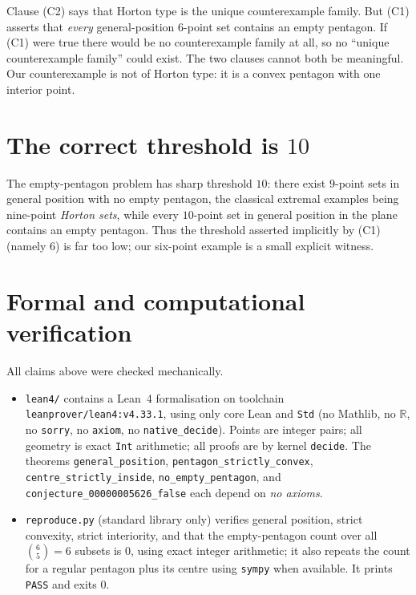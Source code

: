 \documentclass[11pt]{article}
\theoremstyle{remark}
\begin{document}
Clause (C2) says that Horton type is the unique counterexample family.  But
(C1) asserts that \emph{every} general-position $6$-point set contains an
empty pentagon.  If (C1) were true there would be no counterexample family
at all, so no ``unique counterexample family'' could exist.  The two clauses
cannot both be meaningful.  Our counterexample is not of Horton type: it is
a convex pentagon with one interior point.

\section{The correct threshold is $10$}

The empty-pentagon problem has sharp threshold $10$: there exist
$9$-point sets in general position with no empty pentagon, the classical
extremal examples being nine-point \emph{Horton sets}, while every
$10$-point set in general position in the plane contains an empty pentagon.
Thus the threshold asserted implicitly by (C1) (namely $6$) is far too low;
our six-point example is a small explicit witness.

\section{Formal and computational verification}

All claims above were checked mechanically.

\begin{itemize}
\item \texttt{lean4/} contains a Lean~4 formalisation on toolchain
\texttt{leanprover/lean4:v4.33.1}, using only core Lean and \texttt{Std}
(no Mathlib, no $\mathbb{R}$, no \texttt{sorry}, no \texttt{axiom}, no
\texttt{native\_decide}).  Points are integer pairs; all geometry is exact
\texttt{Int} arithmetic; all proofs are by kernel \texttt{decide}.  The
theorems \texttt{general\_position}, \texttt{pentagon\_strictly\_convex},
\texttt{centre\_strictly\_inside}, \texttt{no\_empty\_pentagon}, and
\texttt{conjecture\_00000005626\_false} each depend on \emph{no axioms}.
\item \texttt{reproduce.py} (standard library only) verifies general
position, strict convexity, strict interiority, and that the empty-pentagon
count over all $\binom{6}{5}=6$ subsets is $0$, using exact integer
arithmetic; it also repeats the count for a regular pentagon plus its centre
using \texttt{sympy} when available.  It prints \texttt{PASS} and exits $0$.
\end{itemize}
\end{document}
